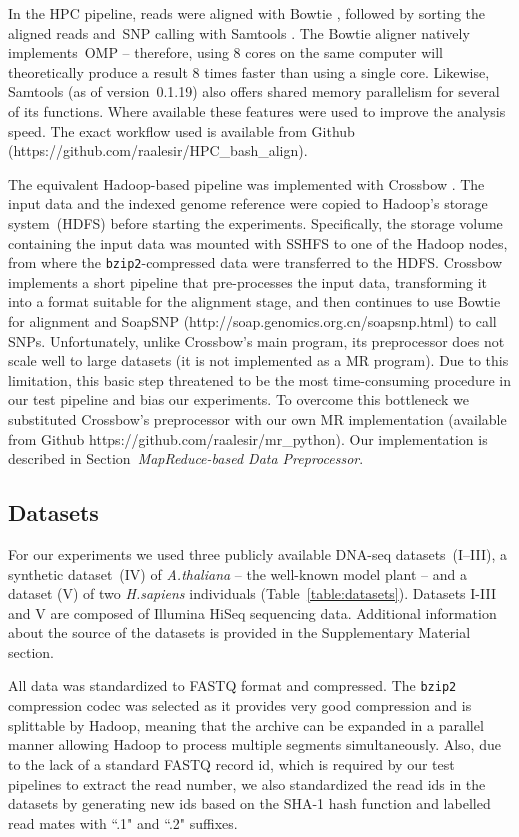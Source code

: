 \documentclass{bioinfo}
\begin{document}
\begin{methods}
In the HPC pipeline, reads were aligned with Bowtie \citep{Langmead:2009uq}, followed by sorting the aligned reads and~SNP calling with Samtools \citep{samtools}. The Bowtie aligner natively implements~OMP -- therefore, using 8 cores on the same computer will theoretically produce a result 8 times faster than using a single core. Likewise, Samtools (as of version~0.1.19) also offers shared memory parallelism for several of its functions. Where available these features were used to improve the analysis speed. The exact workflow used is available from Github (https://github.com/raalesir/HPC\_bash\_align).


The equivalent Hadoop-based pipeline was implemented with Crossbow \citep{Langmead:2009kx}. The input
data and the indexed genome reference were copied to Hadoop's storage
system~(HDFS) before starting the experiments.  Specifically, the storage volume
containing the input data was mounted with SSHFS to one of the Hadoop nodes,
from where the \texttt{bzip2}-compressed data were transferred to the HDFS.
Crossbow implements a short pipeline that pre-processes the input data, transforming it into a format suitable for the alignment stage, and then continues to use Bowtie for alignment and SoapSNP (http://soap.genomics.org.cn/soapsnp.html) to call SNPs.  Unfortunately, unlike Crossbow's main program, its preprocessor does not scale well to large datasets (it is not implemented as a MR program). Due to this limitation, this basic step threatened to be the most time-consuming procedure in our test pipeline and bias our experiments. To overcome this bottleneck we substituted Crossbow's preprocessor with our own MR implementation (available from Github https://github.com/raalesir/mr\_python). Our implementation is described in Section~{\it MapReduce-based Data Preprocessor}.


\subsection*{Datasets}
For our experiments we used three publicly available DNA-seq datasets~(I--III),
a synthetic dataset~(IV) of {\it A.thaliana} -- the well-known model plant --
and a dataset (V) of two {\it H.sapiens} individuals
(Table~\ref{table:datasets}). Datasets I-III and V are composed of Illumina
HiSeq sequencing data. Additional information about the source of the datasets is
provided in the Supplementary Material section.

All data was standardized to FASTQ format and compressed. The
\texttt{bzip2} compression codec was selected as it provides very good compression
and is splittable by Hadoop, meaning that the archive can be expanded in a
parallel manner allowing Hadoop to process multiple segments simultaneously.
Also, due to the lack of a standard FASTQ record id, which is
required by our test pipelines to extract the read number, we also standardized
the read ids in the datasets by generating new ids based on the SHA-1 hash
function and labelled read mates with ``.1" and ``.2" suffixes.


\end{methods}
\end{document}
